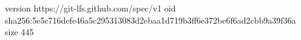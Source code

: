 version https://git-lfs.github.com/spec/v1
oid sha256:5e5c716defe46a5c295313083d2ebaa1d719b3ff6e372be6f6ad2cbb9a39f36a
size 445

